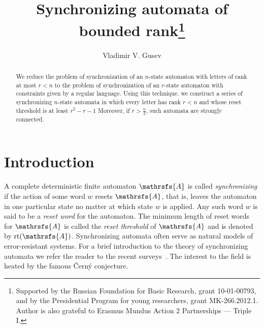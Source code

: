 \documentclass[11pt]{llncs}
\newcommand{\rl}{reset threshold}
\newcommand{\rt}{\mathrm{rt}}
\begin{document}
\title{Synchronizing automata of bounded rank\thanks{Supported by the Russian Foundation for Basic Research,
grant 10-01-00793, and by the Presidential Program for young researchers, grant MK-266.2012.1. Author is also grateful to Erasmus Mundus
Action 2 Partnerships --- Triple I.}}


\author{Vladimir V. Gusev}




\maketitle

\begin{abstract}
We reduce the problem of synchronization of an $n$-state automaton with letters of rank at most $r < n$ to the problem of synchronization
of an $r$-state automaton with constraints given by a regular language. Using this technique. we construct a series of synchronizing
$n$-state automata in which every letter has rank $r < n$ and whose reset threshold is at least $r^2 -r - 1$ Moreover, if $r >
\frac{n}{2}$, such automata are strongly connected.
\end{abstract}

\section{Introduction}
A complete deterministic finite automaton $\mathrsfs{A}$ is called \emph{synchronizing} if the action of some word $w$ resets
$\mathrsfs{A}$, that is, leaves the automaton in one particular state no matter at which state $w$ is applied. Any such word $w$ is said to
be a \emph{reset word} for the automaton. The minimum length of reset words for $\mathrsfs{A}$ is called the \emph{\rl} of $\mathrsfs{A}$
and is denoted by $\rt(\mathrsfs{A})$. Synchronizing automata often serve as natural models of error-resistant systems. For a brief
introduction to the theory of synchronizing automata we refer the reader to the recent surveys~\cite{Sa05,Vo08}. The interest to the field
is heated by the famous \v{C}ern\'{y} conjecture.
\end{document}
